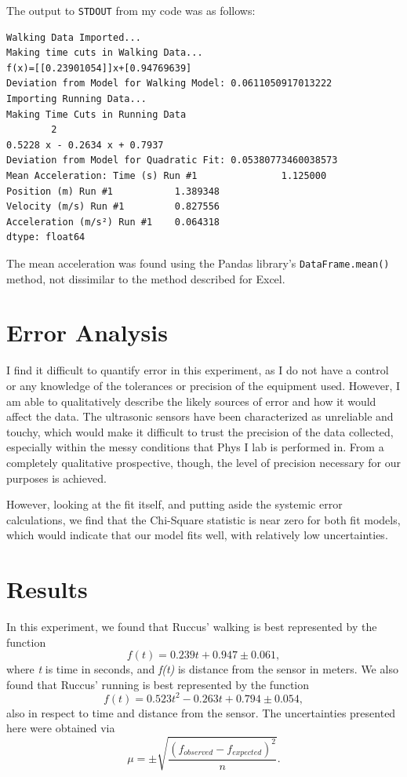 \documentclass[hidelinks, 12pt, letterpaper]{article}
\begin{document}
The output to \verb|STDOUT| from my code was as follows:

\begin{verbatim}
Walking Data Imported... 
Making time cuts in Walking Data... 
f(x)=[[0.23901054]]x+[0.94769639]
Deviation from Model for Walking Model: 0.0611050917013222
Importing Running Data... 
Making Time Cuts in Running Data
        2
0.5228 x - 0.2634 x + 0.7937
Deviation from Model for Quadratic Fit: 0.05380773460038573
Mean Acceleration: Time (s) Run #1               1.125000
Position (m) Run #1           1.389348
Velocity (m/s) Run #1         0.827556
Acceleration (m/s²) Run #1    0.064318
dtype: float64
\end{verbatim}  

The mean acceleration was found using the Pandas library's 
\verb|DataFrame.mean()| method, not dissimilar to the method described
for Excel.

\section{Error Analysis}
I find it difficult to quantify error in this experiment, as I do not have
a control or any knowledge of the tolerances or precision of the equipment used.
However, I am able to qualitatively describe the likely sources of error and 
how it would affect the data.
The ultrasonic sensors have been characterized as unreliable and touchy,
which would make it difficult to trust the precision of the data collected,
especially within the messy conditions that Phys I lab is performed in.
From a completely qualitative prospective, though, the level of precision necessary for our purposes is achieved.

However, looking at the fit itself,
and putting aside the systemic error calculations,
we find that the Chi-Square statistic is near zero for both
fit models, which would indicate that our model fits well, with relatively
low uncertainties.


\section{Results}
In this experiment, we found that Ruccus' walking is best represented
by the function 
\begin{equation}
    f(t) = 0.239t + 0.947 \pm 0.061, 
\end{equation}
where \textit{t} is time in seconds, and \textit{f(t)} is distance from the 
sensor in meters.
We also found that Ruccus' running is best represented by the function
\begin{equation}
    f(t) = 0.523t^{2} - 0.263t + 0.794 \pm 0.054, 
\end{equation}
also in respect to time and distance from the sensor.
The uncertainties presented here were obtained via
\begin{equation}
    \mu = \pm\sqrt{\frac{(f_{observed} - f_{expected})^{2}}{n}}.
\end{equation}
\end{document}
